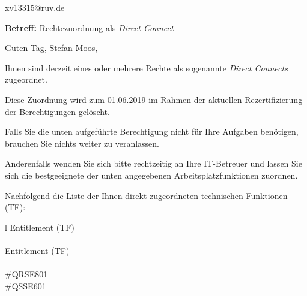 \documentclass[a4paper,landscape,12pt]{letter}
\begin{document}
\begin{letter}{xv13315@ruv.de\hfill \break}
\begin{normalsize}
	\opening{\textbf{Betreff:} Rechtezuordnung als \emph{Direct Connect}}
	\begin{normalsize} \hfill
	\end{normalsize}

	\begin{normalsize}
		Guten Tag, 
	Stefan Moos, \hfill \break
	\end{normalsize}
	\end{normalsize}
	
\begin{normalsize}
	Ihnen sind derzeit eines oder mehrere Rechte als sogenannte \emph{Direct Connects} zugeordnet.
	
	Diese Zuordnung wird zum 01.06.2019 im Rahmen der aktuellen Rezertifizierung der Berechtigungen gelöscht.
	
	Falls Sie die unten aufgeführte Berechtigung nicht für Ihre Aufgaben benötigen, 
	brauchen Sie nichts weiter zu veranlassen.
	
	Anderenfalls wenden Sie sich bitte rechtzeitig an Ihre IT-Betreuer 
	und lassen Sie sich die bestgeeignete der unten angegebenen Arbeitsplatzfunktionen zuordnen.
	\end{normalsize}
	
\begin{normalsize}
	Nachfolgend die Liste der Ihnen direkt zugeordneten technischen Funktionen (TF):

	\begin{longtable}{l}
		Entitlement (TF) \\ \hline
		\endfirsthead
		\\\hline
		Entitlement (TF) \\ \hline
		\endhead %
		\multicolumn{1}{r@{}}{Fortsetzung \ldots}\\
		\endfoot
		\hline
		\endlastfoot
	\#QRSE801\\\#QSSE601\\
	\end{longtable}
	\end{normalsize}
	

\end{letter}
\end{document}
